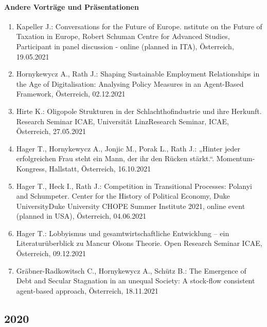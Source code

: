 \paragraph{Andere Vorträge und Präsentationen}
\begin{enumerate}
	\item Kapeller J.: Conversations for the Future of Europe. nstitute on the Future of Taxation in Europe, Robert Schuman Centre for Advanced Studies, Participant in panel discussion - online (planned in ITA), Österreich, 19.05.2021
	\item Hornykewycz A., Rath J.: Shaping Sustainable Employment Relationships in the Age of Digitalisation: Analysing Policy Measures in an Agent-Based Framework, Österreich, 02.12.2021
	\item Hirte K.: Oligopole Strukturen in der Schlachthofindustrie und ihre Herkunft. Research Seminar ICAE, Universität LinzResearch Seminar, ICAE, Österreich, 27.05.2021
	\item Hager T., Hornykewycz A., Jonjic M., Porak L., Rath J.: „Hinter jeder erfolgreichen Frau steht ein Mann, der ihr den Rücken stärkt.“. Momentum-Kongress, Hallstatt, Österreich, 16.10.2021
	\item Hager T., Heck I., Rath J.: Competition in Transitional Processes: Polanyi and Schumpeter. Center for the History of Political Economy, Duke UniversityDuke University CHOPE Summer Institute 2021, online event (planned in USA), Österreich, 04.06.2021
	\item Hager T.: Lobbyismus und gesamtwirtschaftliche Entwicklung – ein Literaturüberblick zu Mancur Olsons Theorie. Open Research Seminar ICAE, Österreich, 09.12.2021
	\item Gräbner-Radkowitsch C., Hornykewycz A., Schütz B.: The Emergence of Debt and Secular Stagnation in an unequal Society: A stock-flow consistent agent-based approach, Österreich, 18.11.2021
\end{enumerate}
\subsection*{2020}


